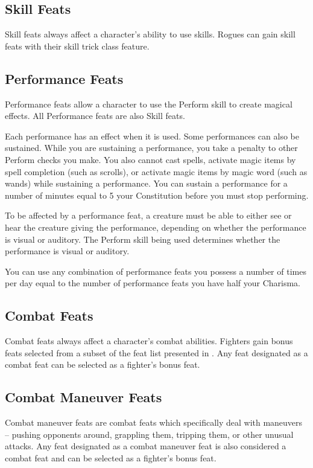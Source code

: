 \subsection{Skill Feats}
Skill feats always affect a character's ability to use skills. Rogues can gain skill feats with their skill trick class feature.

\subsection{Performance Feats}
Performance feats allow a character to use the Perform skill to create magical effects. All Performance feats are also Skill feats.

Each performance has an effect when it is used. Some performances can also be sustained. While you are sustaining a performance, you take a  penalty to other Perform checks you make. You also cannot cast spells, activate magic items by spell completion (such as scrolls), or activate magic items by magic word (such as wands) while sustaining a performance. You can sustain a performance for a number of minutes equal to 5 \add your Constitution before you must stop performing.

To be affected by a performance feat, a creature must be able to either see or hear the creature giving the performance, depending on whether the performance is visual or auditory. The Perform skill being used determines whether the performance is visual or auditory. 

You can use any combination of performance feats you possess a number of times per day equal to the number of performance feats you have \add half your Charisma.

\subsection{Combat Feats}
Combat feats always affect a character's combat abilities. Fighters gain bonus feats selected from a subset of the feat list presented in . Any feat designated as a combat feat can be selected as a fighter's bonus feat.

\subsection{Combat Maneuver Feats}
Combat maneuver feats are combat feats which specifically deal with maneuvers -- pushing opponents around, grappling them, tripping them, or other unusual attacks. Any feat designated as a combat maneuver feat is also considered a combat feat and can be selected as a fighter's bonus feat.

